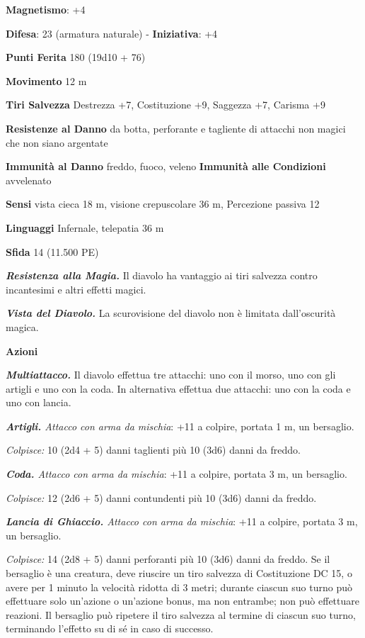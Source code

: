 \begin{multicols}{2}
\textbf{Magnetismo}: +4

\textbf{Difesa}: 23 (armatura naturale) - \textbf{Iniziativa}: +4

\textbf{Punti Ferita} 180 (19d10 + 76)

\textbf{Movimento} 12 m

\textbf{Tiri Salvezza} Destrezza +7, Costituzione +9, Saggezza +7,
Carisma +9

\textbf{Resistenze al Danno} da botta, perforante e tagliente di
attacchi non magici che non siano argentate

\textbf{Immunità al Danno} freddo, fuoco, veleno \textbf{Immunità alle
Condizioni} avvelenato

\textbf{Sensi} vista cieca 18 m, visione crepuscolare 36 m, Percezione passiva
12

\textbf{Linguaggi} Infernale, telepatia 36 m 

\textbf{Sfida} 14 (11.500 PE)\smallskip

\emph{\textbf{Resistenza alla Magia.}} Il diavolo ha vantaggio ai tiri
salvezza contro incantesimi e altri effetti magici.

\emph{\textbf{Vista del Diavolo.}} La scurovisione del diavolo non è
limitata dall'oscurità magica.

\smallskip\textbf{Azioni}

\emph{\textbf{Multiattacco.}} Il diavolo effettua tre attacchi: uno con
il morso, uno con gli artigli e uno con la coda. In alternativa effettua
due attacchi: uno con la coda e uno con lancia.

\emph{\textbf{Artigli.} Attacco con arma da mischia}: +11 a colpire,
portata 1 m, un bersaglio.

\emph{Colpisce:} 10 (2d4 + 5) danni taglienti più 10 (3d6) danni da
freddo.

\emph{\textbf{Coda.} Attacco con arma da mischia}: +11 a colpire,
portata 3 m, un bersaglio.

\emph{Colpisce:} 12 (2d6 + 5) danni contundenti più 10 (3d6) danni da
freddo.

\emph{\textbf{Lancia di Ghiaccio.} Attacco con arma da mischia}: +11 a
colpire, portata 3 m, un bersaglio.

\emph{Colpisce:} 14 (2d8 + 5) danni perforanti più 10 (3d6) danni da
freddo. Se il bersaglio è una creatura, deve riuscire un tiro salvezza
di Costituzione DC 15, o avere per 1 minuto la velocità ridotta di 3
metri; durante ciascun suo turno può effettuare solo un'azione o
un'azione bonus, ma non entrambe; non può effettuare reazioni. Il
bersaglio può ripetere il tiro salvezza al termine di ciascun suo turno,
terminando l'effetto su di sé in caso di successo.


\end{multicols}
